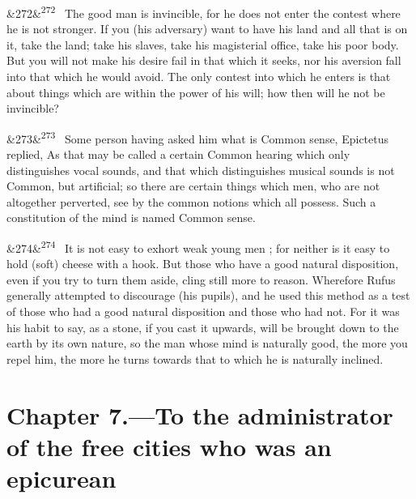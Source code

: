 \documentclass[12pt]{article}
\newcommand{\para}[1][]{\par\noindent\ifx&#1&\else\textsuperscript{\footnotesize #1}~\fi}
\begin{document}
\para[272] The good man is invincible, for he does not enter the contest where he is not stronger. If you (his adversary) want to have his land and all that is on it, take the land; take his slaves, take his magisterial office, take his poor body. But you will not make his desire fail in that which it seeks, nor his aversion fall into that which he would avoid. The only contest into which he enters is that about things which are within the power of his will; how then will he not be invincible?

\para[273] Some person having asked him what is Common sense, Epictetus replied, As that may be called a certain Common hearing which only distinguishes vocal sounds, and that which distinguishes musical sounds is not Common, but artificial; so there are certain things which men, who are not altogether perverted, see by the common notions which all possess. Such a constitution of the mind is named Common sense.

\para[274] It is not easy to exhort weak young men ; for neither is it easy to hold (soft) cheese with a hook. But those who have a good natural disposition, even if you try to turn them aside, cling still more to reason. Wherefore Rufus generally attempted to discourage (his pupils), and he used this method as a test of those who had a good natural disposition and those who had not. For it was his habit to say, as a stone, if you cast it upwards, will be brought down to the earth by its own nature, so the man whose mind is naturally good, the more you repel him, the more he turns towards that to which he is naturally inclined.

\section*{Chapter 7.---To the administrator of the free cities who was an epicurean}
\end{document}
